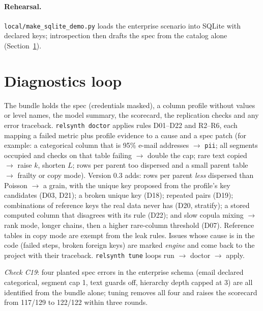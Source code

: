 \documentclass[11pt,a4paper]{article}
\theoremstyle{definition}
\theoremstyle{remark}
\begin{document}
\paragraph{Rehearsal.} \texttt{local/make\_sqlite\_demo.py} loads the enterprise scenario into SQLite with declared keys; introspection then drafts the spec from the catalog alone (Section~\ref{sec:doctor}).

\section{Diagnostics loop}\label{sec:doctor}
The bundle holds the spec (credentials masked), a column profile without values or level names, the model summary, the scorecard, the replication checks and any error traceback. \texttt{relsynth doctor} applies rules D01--D22 and R2--R6, each mapping a failed metric plus profile evidence to a cause and a spec patch (for example: a categorical column that is 95\% e-mail addresses $\to$ \texttt{pii}; all segments occupied and checks on that table failing $\to$ double the cap; rare text copied $\to$ raise $k$, shorten $L$; rows per parent too dispersed and a small parent table $\to$ frailty or copy mode). Version 0.3 adds: rows per parent \emph{less} dispersed than Poisson $\to$ a grain, with the unique key proposed from the profile's key candidates (D03, D21); a broken unique key (D18); repeated pairs (D19); combinations of reference keys the real data never has (D20, stratify); a stored computed column that disagrees with its rule (D22); and slow copula mixing $\to$ rank mode, longer chains, then a higher rare-column threshold (D07). Reference tables in copy mode are exempt from the leak rules. Issues whose cause is in the code (failed steps, broken foreign keys) are marked \emph{engine} and come back to the project with their traceback. \texttt{relsynth tune} loops run $\to$ doctor $\to$ apply.

\noindent\emph{Check C19}: four planted spec errors in the enterprise schema (email declared categorical, segment cap 1, text guards off, hierarchy depth capped at 3) are all identified from the bundle alone; tuning removes all four and raises the scorecard from 117/129 to 122/122 within three rounds.

\end{document}
